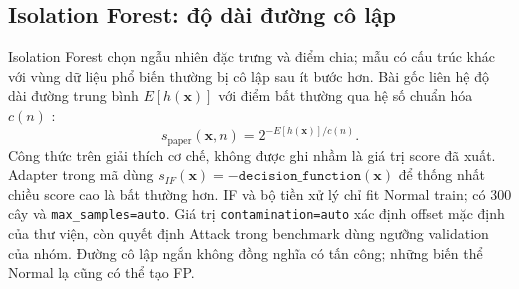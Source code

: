 \subsection{Isolation Forest: độ dài đường cô lập}
Isolation Forest chọn ngẫu nhiên đặc trưng và điểm chia; mẫu có cấu trúc khác với vùng dữ liệu phổ biến thường bị cô lập sau ít bước hơn. Bài gốc liên hệ độ dài đường trung bình $E[h(\mathbf{x})]$ với điểm bất thường qua hệ số chuẩn hóa $c(n)$ \cite{liu2008}:
\begin{equation}
s_{\mathrm{paper}}(\mathbf{x},n)=2^{-E[h(\mathbf{x})]/c(n)}.
\end{equation}
Công thức trên giải thích cơ chế, không được ghi nhầm là giá trị score đã xuất. Adapter trong mã dùng $s_{IF}(\mathbf{x})=-\texttt{decision\_function}(\mathbf{x})$ để thống nhất chiều score cao là bất thường hơn. IF và bộ tiền xử lý chỉ fit Normal train; có 300 cây và \texttt{max\_samples=auto}. Giá trị \texttt{contamination=auto} xác định offset mặc định của thư viện, còn quyết định Attack trong benchmark dùng ngưỡng validation của nhóm. Đường cô lập ngắn không đồng nghĩa có tấn công; những biến thể Normal lạ cũng có thể tạo FP.

